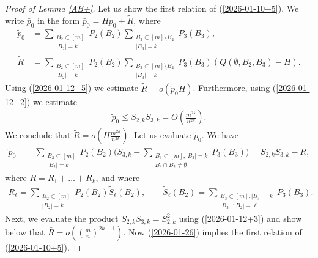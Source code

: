 \documentclass[11pt, a4paper]{article}
\begin{document}
\begin{proof}[ Proof of Lemma \ref{AB+}]
Let us show the first relation of (\ref{2026-01-10+5}).
We write ${\bar p}_0$ in the form
${\bar p}_0
=
H{\tilde p}_0+{\tilde R}$,
where
\begin{align*}
{\tilde p}_0
&
=
\sum_{\substack{B_2\subset [m]\\
|B_2|=k}}
P_2(B_2)
\sum_{\substack{B_3\subset [m]\setminus B_2\\
|B_3|=k}}
P_3(B_3),
\\
{\tilde R}
&
=
\sum_{\substack{B_2\subset [m]\\
|B_2|=k}}
P_2(B_2)
\sum_{\substack{B_3\subset [m]\setminus B_2\\
|B_3|=k}}
P_3(B_3) (Q(\emptyset, B_2,B_3)-H).
\end{align*}
Using  (\ref{2026-01-12+5}) we estimate
${\tilde R}=o\left({\tilde p}_0H
\right)$.
Furthermore, using
(\ref{2026-01-12+2}) we estimate
\begin{align*}
{\tilde p}_0
\le 
S_{2,k}S_{3,k}
=
O
\left(\frac{m^{2k}}{n^{2k}}\right).
\end{align*}
We conclude that 
${\tilde R}
=
o\left(H\frac{m^{2k}}{n^{2k}}
\right)$.
Let us evaluate ${\tilde p}_0$.
We have
\begin{align}
\label{2026-01-26}
{\tilde p}_0
&=
\sum_{\substack{B_2\subset [m]\\
|B_2|=k}}
P_2(B_2)
\Biggl(
S_{3,k}
-
\sum_{\substack{B_3\subset [m],|B_3|=k\\
B_3\cap B_2\not=\emptyset}}
P_3(B_3)
\Biggr)
=
S_{2,k}S_{3,k}-{\bar R},
\end{align}
where 
${\bar R}
=
R_1+\dots+R_k$, 
and where
\begin{align*}
R_\ell
=
\sum_{\substack{B_2\subset [m]\\
|B_2|=k}}
P_2(B_2)
{\tilde S}_\ell(B_2),
\qquad
{\tilde S}_\ell(B_2)
=
\sum_{\substack{B_3\subset [m],|B_3|=k\\
|B_3\cap B_2|=\ell}}
P_3(B_3).
\end{align*}
Next, we evaluate the product $S_{2,k}S_{3,k}=S_{2,k}^2$ 
using (\ref{2026-01-12+3}) and show below that
${\bar R}=o
\left(
\left(\frac{m}{n}\right)^{2k-1}
\right)$. Now (\ref{2026-01-26}) implies 
 the first relation of 
(\ref{2026-01-10+5}).







\end{proof}
\end{document}
